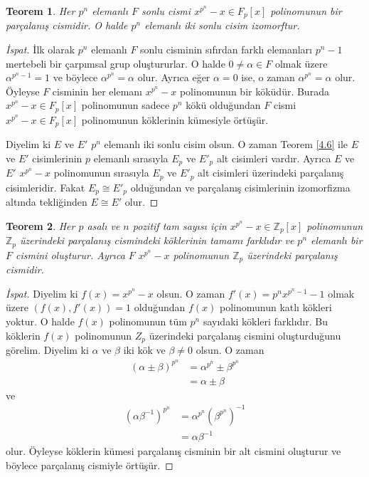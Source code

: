 \documentclass{article}
\newtheorem{thm}{Teorem}[section]
\theoremstyle{definition}
\theoremstyle{remark}
\begin{document}
    	    \begin{thm}\label{4.7}
    	        Her $p^n$ elemanlı $F$ sonlu cismi $x^{p^n} - x \in F_p[x]$ polinomunun bir parçalanış cismidir. O halde $p^n$ elemanlı iki sonlu cisim izomorftur.
    	    \end{thm}
    	    
    	    \begin{proof}[İspat]
    	        İlk olarak $p^n$ elemanlı $F$ sonlu cisminin sıfırdan farklı elemanları $p^n - 1$ mertebeli bir çarpımsal grup oluştururlar. O halde $0 \neq \alpha \in F$ olmak üzere $\alpha^{p^n - 1} = 1$ ve böylece $\alpha^{p^n} = \alpha$ olur. Ayrıca eğer $\alpha = 0$ ise, o zaman $\alpha^{p^n} = \alpha$ olur. Öyleyse $F$ cisminin her elemanı $x^{p^n} - x$ polinomunun bir köküdür. Burada $x^{p^n} - x \in F_p[x]$ polinomunun sadece $p^n$ kökü olduğundan $F$ cismi $x^{p^n} - x \in F_p[x]$ polinomunun köklerinin kümesiyle örtüşür.\par
    	        Diyelim ki $E$ ve $E'$ $p^n$ elemanlı iki sonlu cisim olsun. O zaman Teorem \ref{4.6} ile $E$ ve $E'$ cisimlerinin $p$ elemanlı sırasıyla $E_p$ ve $E'_p$ alt cisimleri vardır. Ayrıca $E$ ve $E'$ $x^{p^n} - x$ polinomunun sırasıyla $E_p$ ve $E'_p$ alt cisimleri üzerindeki parçalanış cisimleridir. Fakat $E_p \cong E'_p$ olduğundan ve parçalanış cisimlerinin izomorfizma altında tekliğinden $E \cong E'$ olur.
    	    \end{proof}
    	    
    	    \begin{thm}\label{4.8}
    	        Her $p$ asalı ve $n$ pozitif tam sayısı için $x^{p^n} - x \in \mathbb{Z}_p[x]$ polinomunun $\mathbb{Z}_p$ üzerindeki parçalanış cismindeki köklerinin tamamı farklıdır ve $p^n$ elemanlı bir $F$ cismini oluşturur. Ayrıca $F$ $x^{p^n} - x$ polinomunun $\mathbb{Z}_p$ üzerindeki parçalanış cismidir.
    	    \end{thm}
    	    
    	    \begin{proof}[İspat]
    	        Diyelim ki $f(x) = x^{p^n} - x$ olsun. O zaman $f'(x) = p^n x^{p^n - 1} - 1$ olmak üzere $(f(x), f'(x)) = 1$ olduğundan $f(x)$ polinomunun katlı kökleri yoktur. O halde $f(x)$ polinomunun tüm $p^n$ sayıdaki kökleri farklıdır. Bu köklerin $f(x)$ polinomunun $Z_p$ üzerindeki parçalanış cismini oluşturduğunu görelim. Diyelim ki $\alpha$ ve $\beta$ iki kök ve $\beta \neq 0$ olsun. O zaman
    	        \begin{align*}
    	            (\alpha \pm \beta)^{p^n} &= \alpha^{p^n} \pm \beta^{p^n}\\
    	            &= \alpha \pm \beta
    	        \end{align*}
    	        ve
    	        \begin{align*}
    	            (\alpha \beta^{-1})^{p^n} &= \alpha^{p^n} (\beta^{p^n})^{-1}\\
    	            &= \alpha \beta^{-1}
    	        \end{align*}
    	        olur. Öyleyse köklerin kümesi parçalanış cisminin bir alt cismini oluşturur ve böylece parçalanış cismiyle örtüşür.
    	    \end{proof}
    	    
\end{document}
